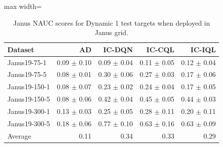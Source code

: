 \documentclass{article}
\begin{document}
\begin{table}[ht]
    \label{tab:}
    \begin{center}
    \caption{Janus NAUC scores for Dynamic 1 test targets when deployed in Janus grid.}
    \begin{small}
    \begin{adjustbox}{max width=\columnwidth}
		\begin{tabular}{l|rrrr}
		\toprule
	\textbf{Dataset} & \textbf{AD} & \textbf{IC-DQN} & \textbf{IC-CQL} & \textbf{IC-IQL}\\
\midrule
Janus19-75-1 & 0.09 $\pm$ 0.10 & 0.09 $\pm$ 0.04 & 0.11 $\pm$ 0.05 & 0.12 $\pm$ 0.04\\
Janus19-75-5 & 0.08 $\pm$ 0.01 & 0.30 $\pm$ 0.06 & 0.27 $\pm$ 0.03 & 0.17 $\pm$ 0.06\\
Janus19-150-1 & 0.08 $\pm$ 0.07 & 0.23 $\pm$ 0.02 & 0.24 $\pm$ 0.04 & 0.17 $\pm$ 0.05\\
Janus19-150-5 & 0.08 $\pm$ 0.06 & 0.42 $\pm$ 0.04 & 0.45 $\pm$ 0.05 & 0.44 $\pm$ 0.03\\
Janus19-300-1 & 0.13 $\pm$ 0.03 & 0.25 $\pm$ 0.05 & 0.28 $\pm$ 0.11 & 0.20 $\pm$ 0.11\\
Janus19-300-5 & 0.18 $\pm$ 0.06 & 0.77 $\pm$ 0.10 & 0.63 $\pm$ 0.16 & 0.63 $\pm$ 0.09\\
\midrule
Average & 0.11 & 0.34 & 0.33 & 0.29\\
\end{tabular}
        \end{adjustbox}
    \end{small}
    \end{center}
    \vskip -0.1in
\end{table}
\end{document}
